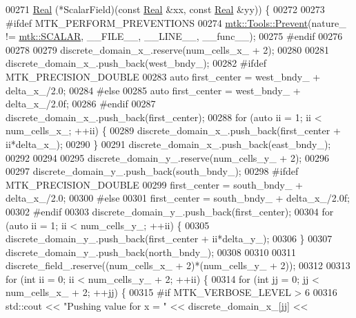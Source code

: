 \begin{DoxyCode}
00271     \hyperlink{group__c01-roots_gac080bbbf5cbb5502c9f00405f894857d}{Real} (*ScalarField)(\textcolor{keyword}{const} \hyperlink{group__c01-roots_gac080bbbf5cbb5502c9f00405f894857d}{Real} &xx, \textcolor{keyword}{const} \hyperlink{group__c01-roots_gac080bbbf5cbb5502c9f00405f894857d}{Real} &yy)) \{
00272 
00273 \textcolor{preprocessor}{  #ifdef MTK\_PERFORM\_PREVENTIONS}
00274   \hyperlink{classmtk_1_1Tools_a332324c6f25e66be9dff48c5987a3b9f}{mtk::Tools::Prevent}(nature\_ != \hyperlink{namespacemtk_ga4c54f2a329cfb4e56213b02a259d19e2af481d45bd70d41381c7d72e200889205}{mtk::SCALAR}, \_\_FILE\_\_, \_\_LINE\_\_, \_\_func\_\_);
00275 \textcolor{preprocessor}{  #endif}
00276 
00278 
00279   discrete\_domain\_x\_.reserve(num\_cells\_x\_ + 2);
00280 
00281   discrete\_domain\_x\_.push\_back(west\_bndy\_);
00282 \textcolor{preprocessor}{  #ifdef MTK\_PRECISION\_DOUBLE}
00283   \textcolor{keyword}{auto} first\_center = west\_bndy\_ + delta\_x\_/2.0;
00284 \textcolor{preprocessor}{  #else}
00285   \textcolor{keyword}{auto} first\_center = west\_bndy\_ + delta\_x\_/2.0f;
00286 \textcolor{preprocessor}{  #endif}
00287   discrete\_domain\_x\_.push\_back(first\_center);
00288   \textcolor{keywordflow}{for} (\textcolor{keyword}{auto} ii = 1; ii < num\_cells\_x\_; ++ii) \{
00289     discrete\_domain\_x\_.push\_back(first\_center + ii*delta\_x\_);
00290   \}
00291   discrete\_domain\_x\_.push\_back(east\_bndy\_);
00292 
00294 
00295   discrete\_domain\_y\_.reserve(num\_cells\_y\_ + 2);
00296 
00297   discrete\_domain\_y\_.push\_back(south\_bndy\_);
00298 \textcolor{preprocessor}{  #ifdef MTK\_PRECISION\_DOUBLE}
00299   first\_center = south\_bndy\_ + delta\_x\_/2.0;
00300 \textcolor{preprocessor}{  #else}
00301   first\_center = south\_bndy\_ + delta\_x\_/2.0f;
00302 \textcolor{preprocessor}{  #endif}
00303   discrete\_domain\_y\_.push\_back(first\_center);
00304   \textcolor{keywordflow}{for} (\textcolor{keyword}{auto} ii = 1; ii < num\_cells\_y\_; ++ii) \{
00305     discrete\_domain\_y\_.push\_back(first\_center + ii*delta\_y\_);
00306   \}
00307   discrete\_domain\_y\_.push\_back(north\_bndy\_);
00308 
00310 
00311   discrete\_field\_.reserve((num\_cells\_x\_ + 2)*(num\_cells\_y\_ + 2));
00312 
00313   \textcolor{keywordflow}{for} (\textcolor{keywordtype}{int} ii = 0; ii < num\_cells\_y\_ + 2; ++ii) \{
00314     \textcolor{keywordflow}{for} (\textcolor{keywordtype}{int} jj = 0; jj < num\_cells\_x\_ + 2; ++jj) \{
00315 \textcolor{preprocessor}{      #if MTK\_VERBOSE\_LEVEL > 6}
00316       std::cout << \textcolor{stringliteral}{"Pushing value for x = "} << discrete\_domain\_x\_[jj] <<

\end{DoxyCode}
